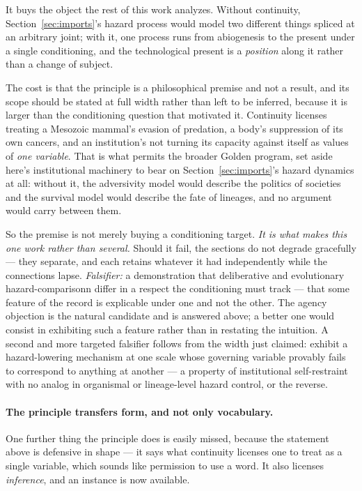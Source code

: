\begin{remark}
\label{gc:rem:continuitycost}
It buys the object the rest of this work analyzes. Without continuity,
Section~\ref{sec:imports}'s hazard process would model two different things
spliced at an arbitrary joint; with it, one process runs from
abiogenesis to the present under a single conditioning, and the
technological present is a \emph{position} along it rather than a change
of subject.

The cost is that the principle is a philosophical premise and not a
result, and its scope should be stated at full width rather than left to
be inferred, because it is larger than the conditioning question that
motivated it. Continuity licenses treating a Mesozoic mammal's evasion
of predation, a body's suppression of its own cancers, and an
institution's not turning its capacity against itself as values of
\emph{one variable}. That is what permits the broader Golden program, set aside here's institutional
machinery to bear on Section~\ref{sec:imports}'s hazard dynamics at all: without
it, the adversivity model would describe the politics of societies and
the survival model would describe the fate of lineages, and no argument
would carry between them.

So the premise is not merely buying a conditioning target. \emph{It is
what makes this one work rather than several.} Should it fail, the
sections do not degrade gracefully --- they separate, and each retains
whatever it had independently while the connections lapse. \emph{Falsifier:} a demonstration that deliberative and evolutionary
hazard-comparisonn differ in a respect the conditioning must track ---
that some feature of the record is explicable under one and not the
other. The agency objection is the natural candidate and is answered
above; a better one would consist in exhibiting such a feature rather
than in restating the intuition. A second and more targeted falsifier
follows from the width just claimed: exhibit a hazard-lowering mechanism
at one scale whose governing variable provably fails to correspond to
anything at another --- a property of institutional self-restraint with
no analog in organismal or lineage-level hazard control, or the
reverse.
\end{remark}

\paragraph{The principle transfers form, and not only vocabulary.}\label{gc:rem:continuitydeductive}
One further thing the principle does is easily missed, because the
statement above is defensive in shape --- it says what continuity
licenses one to treat as a single variable, which sounds like permission
to use a word. It also licenses \emph{inference}, and an instance is now
available.

